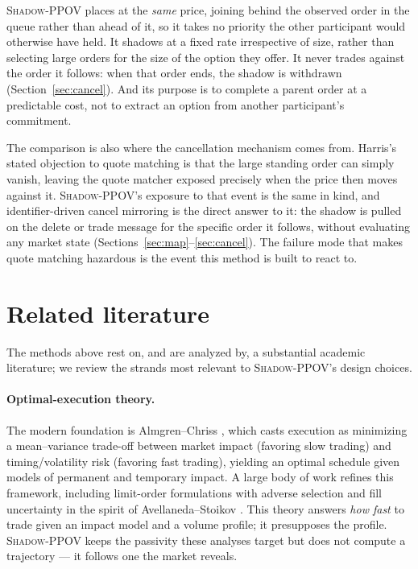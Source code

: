 \documentclass[11pt]{article}
\newcommand{\pov}{\textsc{Shadow-PPOV}}
\begin{document}
\pov{} places at the \emph{same} price, joining behind the observed order in the
queue rather than ahead of it, so it takes no priority the other participant
would otherwise have held. It shadows at a fixed rate irrespective of size,
rather than selecting large orders for the size of the option they offer. It
never trades against the order it follows: when that order ends, the shadow is
withdrawn (Section~\ref{sec:cancel}). And its purpose is to complete a parent
order at a predictable cost, not to extract an option from another participant's
commitment.

The comparison is also where the cancellation mechanism comes from. Harris's
stated objection to quote matching is that the large standing order can simply
vanish, leaving the quote matcher exposed precisely when the price then moves
against it. \pov{}'s exposure to that event is the same in kind, and
identifier-driven cancel mirroring is the direct answer to it: the shadow is
pulled on the delete or trade message for the specific order it follows, without
evaluating any market state (Sections~\ref{sec:map}--\ref{sec:cancel}). The
failure mode that makes quote matching hazardous is the event this method is
built to react to.

\section{Related literature}
\label{sec:lit}

The methods above rest on, and are analyzed by, a substantial academic
literature; we review the strands most relevant to \pov{}'s design choices.

\paragraph{Optimal-execution theory.} The modern foundation is Almgren--Chriss
\cite{almgren2000}, which casts execution as minimizing a mean--variance
trade-off between market impact (favoring slow trading) and timing/volatility
risk (favoring fast trading), yielding an optimal schedule given models of
permanent and temporary impact. A large body of work refines this framework,
including limit-order formulations with adverse selection and fill uncertainty
in the spirit of Avellaneda--Stoikov \cite{avellaneda2008}. This theory
answers \emph{how fast} to trade given an impact model and a volume profile;
it presupposes the profile. \pov{} keeps the passivity these analyses target
but does not compute a trajectory --- it follows one the market reveals.
\end{document}
